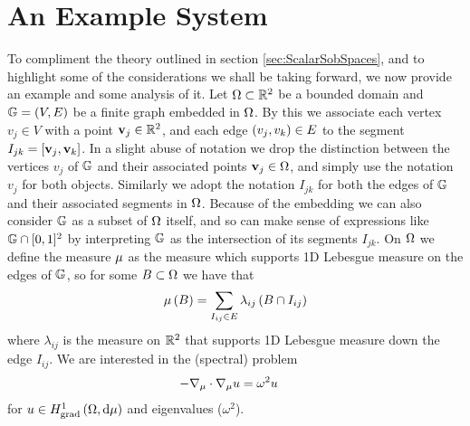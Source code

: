 \section{An Example System} \label{sec:ScalarExample}
To compliment the theory outlined in section \ref{sec:ScalarSobSpaces}, and to highlight some of the considerations we shall be taking forward, we now provide an example and some analysis of it.
Let $\Omega\subset\mathbb{R}^2$ be a bounded domain and $\mathbb{G} = \left( V,E \right)$ be a finite graph embedded in $\Omega$. 
By this we associate each vertex $v_j\in V$ with a point $\mathbf{v}_j\in\mathbb{R}^2$, and each edge $\left( v_j,v_k \right)\in E$ to the segment $I_{jk}=\left[ \mathbf{v}_j,\mathbf{v}_k \right]$.
In a slight abuse of notation we drop the distinction between the vertices $v_j$ of $\mathbb{G}$ and their associated points $\mathbf{v}_j\in\Omega$, and simply use the notation $v_j$ for both objects.
Similarly we adopt the notation $I_{jk}$ for both the edges of $\mathbb{G}$ and their associated segments in $\Omega$.
Because of the embedding we can also consider $\mathbb{G}$ as a subset of $\Omega$ itself, and so can make sense of expressions like $\mathbb{G}\cap[0,1]^2$ by interpreting $\mathbb{G}$ as the intersection of its segments $I_{jk}$. 
On $\Omega$ we define the measure $\mu$ as the measure which supports 1D Lebesgue measure on the edges of $\mathbb{G}$, so for some $B\subset\Omega$ we have that 
\begin{align*}
	\mu\left( B \right) = \sum_{I_{ij}\in E}\lambda_{ij}\left( B \cap I_{ij} \right)
\end{align*}
where $\lambda_{ij}$ is the measure on $\mathbb{R}^2$ that supports 1D Lebesgue measure down the edge $I_{ij}$. 
We are interested in the (spectral) problem
\begin{align} \label{eq:ScalarExampleStrongForm}
	-\nabla_\mu \cdot \nabla_\mu u &= \omega^2 u
\end{align}
for $u\in H^1_\mathrm{grad}\left( \Omega, \mathrm{d}\mu \right)$ and eigenvalues ($\omega^2$).


